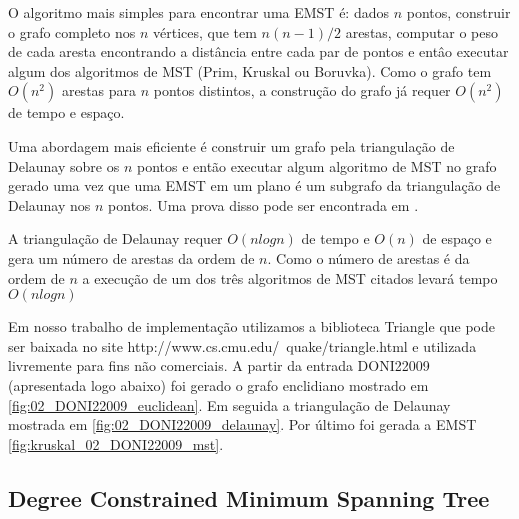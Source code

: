 \documentclass[12pt,a4paper]{article}
\begin{document}


O algoritmo mais simples para encontrar uma EMST é: dados $n$ pontos, construir
o grafo completo nos $n$ vértices, que tem $n(n-1)/2$ arestas, computar o peso
de cada aresta encontrando a distância entre cada par de pontos e entâo executar
algum dos algoritmos de MST (Prim, Kruskal ou Boruvka). Como o grafo tem
$O(n^2)$ arestas para $n$ pontos distintos, a construção do grafo já requer
$O(n^2)$ de tempo e espaço.


Uma abordagem mais eficiente é construir um grafo pela triangulação de Delaunay
sobre os $n$ pontos e então executar algum algoritmo de MST no grafo gerado uma
vez que uma EMST em um plano é um subgrafo da triangulação de Delaunay nos $n$
pontos. Uma prova disso pode ser encontrada em \cite{subramani-computational}.

A triangulação de Delaunay requer $O(n log n)$ de tempo e $O(n)$ de espaço e
gera um número de arestas da ordem de $n$. Como o número de arestas é da ordem
de $n$ a execução de um dos três algoritmos de MST citados levará tempo $O(n log
n)$

Em nosso trabalho de implementação utilizamos a biblioteca Triangle que pode ser
baixada no site http://www.cs.cmu.edu/~quake/triangle.html e utilizada
livremente para fins não comerciais.  A partir da entrada DONI22009 (apresentada
logo abaixo) foi gerado o grafo enclidiano mostrado em
\ref{fig:02_DONI22009_euclidean}. Em seguida a triangulação de Delaunay mostrada
em \ref{fig:02_DONI22009_delaunay}. Por último foi gerada a EMST
\ref{fig:kruskal_02_DONI22009_mst}.



\subsection{Degree Constrained Minimum Spanning Tree}
\end{document}
